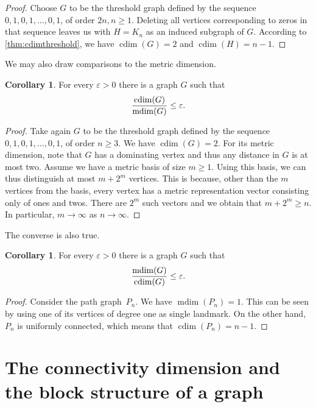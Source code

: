 \documentclass[letterpaper,12pt,headings=normal,parskip=half]{scrartcl}
\DeclareMathOperator{\cdim}{cdim}
\DeclareMathOperator{\mdim}{mdim}
\theoremstyle{definition}
\newtheorem{corollary}[theorem]{Corollary}
\begin{document}
\begin{proof}
    Choose $G$ to be the threshold graph defined by the sequence $0,1,0,1,\ldots,0,1$, of order $2n, n\geq 1$. 
    Deleting all vertices corresponding to zeros in that sequence leaves us with $H=K_n$ as an induced subgraph of $G$. According to \cref{thm:cdimthreshold}, we have $\cdim(G)=2$ and $\cdim(H)=n-1.$
\end{proof}
We may also draw comparisons to the metric dimension.
\begin{corollary}\label{cor:metricratio1}
    For every $\varepsilon>0$ there is a graph $G$ such that
\begin{equation*}
    \frac{\cdim(G)}{\mdim(G)}\leq\varepsilon.\vspace{-1ex}
\end{equation*}
\begin{proof}
    Take again $G$ to be the threshold graph defined by the sequence $0,1,0,1,\ldots,0,1$, of order $n\geq 3$. We have $\cdim(G)=2$. For its metric dimension, note that $G$ has a dominating vertex and thus any distance in $G$ is at most two. Assume we have a metric basis of size $m\geq 1$. Using this basis, we can thus distinguish at most $m+2^m$ vertices. This is because, other than the $m$ vertices from the basis, every vertex has a metric representation vector consisting only of ones and twos. There are $2^m$ such vectors and we obtain that $m+2^m\geq n$. In particular, $m\to\infty$ as $n\to\infty$.
\end{proof}
\end{corollary}
The converse is also true.
\begin{corollary}\label{cor:metricratio2}
    For every $\varepsilon>0$ there is a graph $G$ such that
\begin{equation*}
    \frac{\mdim(G)}{\cdim(G)}\leq\varepsilon.\vspace{-1ex}
\end{equation*}
\begin{proof}
   Consider the path graph~$P_n$. We have $\mdim(P_n)=1$. This can be seen by using one of its vertices of degree one as single landmark. On the other hand, $P_n$ is uniformly connected, which means that $\cdim(P_n)=n-1$.
\end{proof}
\end{corollary}

\section{The connectivity dimension and the block structure of a graph}\label{sec:blockstructure}
\end{document}
